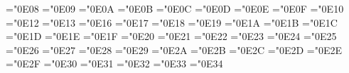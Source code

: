 \mathchardef\sum ="0E08
\let\mSum=\sum 
\mathchardef\prod ="0E09
\let\mProduct=\prod 
\mathchardef\cap ="0E0A
\let\mIntersection=\cap 
\mathchardef\cup ="0E0B
\let\mUnion=\cup 
\mathchardef\biguplus ="0E0C
\let\mUnionPlus=\biguplus 
\mathchardef\sqcap ="0E0D
\let\mSquareIntersection=\sqcap 
\mathchardef\sqcup ="0E0E
\let\mSquareUnion=\sqcup 
\mathchardef\wedge ="0E0F
\let\mWedge=\wedge 
\mathchardef\land ="0E10
\let\mAnd=\land 
\def\mNand{\@unicode{Nand}}
\mathchardef\vee ="0E12
\let\mVee=\vee 
\mathchardef\lor ="0E13
\let\mOr=\lor 
\def\mNor{\@unicode{Nor}}
\def\mXor{\@unicode{Xor}}
\mathchardef\partial ="0E16
\let\mPartialD=\partial 
\mathchardef\DifferentialD ="0E17
\let\mDifferentialD=\DifferentialD 
\mathchardef\CapitalDifferentialD ="0E18
\let\mCapitalDifferentialD=\CapitalDifferentialD 
\mathchardef\rightarrow ="0E19
\let\mRightArrow=\rightarrow 
\mathchardef\leftarrow ="0E1A
\let\mLeftArrow=\leftarrow 
\mathchardef\uparrow ="0E1B
\let\mUpArrow=\uparrow 
\mathchardef\downarrow ="0E1C
\let\mDownArrow=\downarrow 
\mathchardef\leftrightarrow ="0E1D
\let\mLeftRightArrow=\leftrightarrow 
\mathchardef\updownarrow ="0E1E
\let\mUpDownArrow=\updownarrow 
\mathchardef\ShortRightArrow ="0E1F
\let\mShortRightArrow=\ShortRightArrow 
\mathchardef\ShortLeftArrow ="0E20
\let\mShortLeftArrow=\ShortLeftArrow 
\mathchardef\ShortUpArrow ="0E21
\let\mShortUpArrow=\ShortUpArrow 
\mathchardef\ShortDownArrow ="0E22
\let\mShortDownArrow=\ShortDownArrow 
\mathchardef\RuleDelayed ="0E23
\let\mRuleDelayed=\RuleDelayed 
\mathchardef\rightarrow ="0E24
\let\mRule=\rightarrow 
\mathchardef\Rightarrow ="0E25
\let\mDoubleRightArrow=\Rightarrow 
\mathchardef\Leftarrow ="0E26
\let\mDoubleLeftArrow=\Leftarrow 
\mathchardef\Uparrow ="0E27
\let\mDoubleUpArrow=\Uparrow 
\mathchardef\Downarrow ="0E28
\let\mDoubleDownArrow=\Downarrow 
\mathchardef\Leftrightarrow ="0E29
\let\mDoubleLeftRightArrow=\Leftrightarrow 
\mathchardef\Updownarrow ="0E2A
\let\mDoubleUpDownArrow=\Updownarrow 
\mathchardef\RightArrowBar ="0E2B
\let\mRightArrowBar=\RightArrowBar 
\mathchardef\LeftArrowBar ="0E2C
\let\mLeftArrowBar=\LeftArrowBar 
\mathchardef\UpArrowBar ="0E2D
\let\mUpArrowBar=\UpArrowBar 
\mathchardef\DownArrowBar ="0E2E
\let\mDownArrowBar=\DownArrowBar 
\mathchardef\mapsto ="0E2F
\let\mRightTeeArrow=\mapsto 
\mathchardef\LeftTeeArrow ="0E30
\let\mLeftTeeArrow=\LeftTeeArrow 
\mathchardef\UpTeeArrow ="0E31
\let\mUpTeeArrow=\UpTeeArrow 
\mathchardef\DownTeeArrow ="0E32
\let\mDownTeeArrow=\DownTeeArrow 
\mathchardef\nwarrow ="0E33
\let\mUpperLeftArrow=\nwarrow 
\mathchardef\nearrow ="0E34
\let\mUpperRightArrow=\nearrow 
